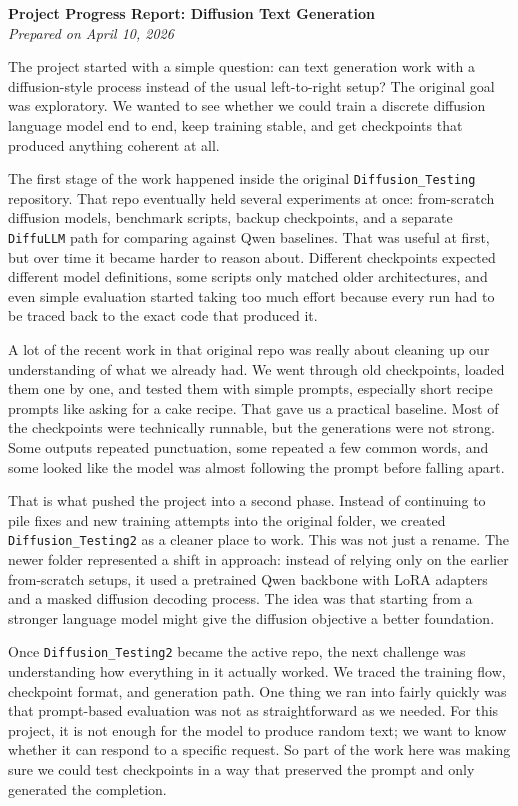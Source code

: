 \documentclass[10pt]{article}
\begin{document}
{\Large \textbf{Project Progress Report: Diffusion Text Generation}}\\
\textit{Prepared on April 10, 2026}

\vspace{0.6em}

The project started with a simple question: can text generation work with a diffusion-style process instead of the usual left-to-right setup? The original goal was exploratory. We wanted to see whether we could train a discrete diffusion language model end to end, keep training stable, and get checkpoints that produced anything coherent at all.

The first stage of the work happened inside the original \texttt{Diffusion\_Testing} repository. That repo eventually held several experiments at once: from-scratch diffusion models, benchmark scripts, backup checkpoints, and a separate \texttt{DiffuLLM} path for comparing against Qwen baselines. That was useful at first, but over time it became harder to reason about. Different checkpoints expected different model definitions, some scripts only matched older architectures, and even simple evaluation started taking too much effort because every run had to be traced back to the exact code that produced it.

A lot of the recent work in that original repo was really about cleaning up our understanding of what we already had. We went through old checkpoints, loaded them one by one, and tested them with simple prompts, especially short recipe prompts like asking for a cake recipe. That gave us a practical baseline. Most of the checkpoints were technically runnable, but the generations were not strong. Some outputs repeated punctuation, some repeated a few common words, and some looked like the model was almost following the prompt before falling apart.

That is what pushed the project into a second phase. Instead of continuing to pile fixes and new training attempts into the original folder, we created \texttt{Diffusion\_Testing2} as a cleaner place to work. This was not just a rename. The newer folder represented a shift in approach: instead of relying only on the earlier from-scratch setups, it used a pretrained Qwen backbone with LoRA adapters and a masked diffusion decoding process. The idea was that starting from a stronger language model might give the diffusion objective a better foundation.

Once \texttt{Diffusion\_Testing2} became the active repo, the next challenge was understanding how everything in it actually worked. We traced the training flow, checkpoint format, and generation path. One thing we ran into fairly quickly was that prompt-based evaluation was not as straightforward as we needed. For this project, it is not enough for the model to produce random text; we want to know whether it can respond to a specific request. So part of the work here was making sure we could test checkpoints in a way that preserved the prompt and only generated the completion.
\end{document}
